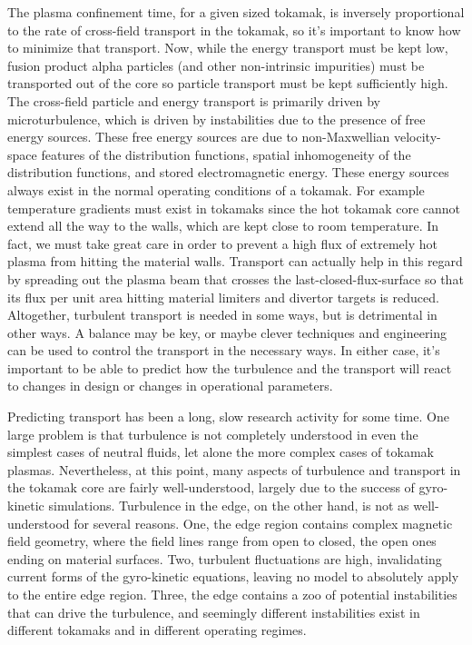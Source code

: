 The plasma confinement time, for a given sized tokamak, is inversely proportional to the rate of cross-field transport in the tokamak, so it's important to know how to minimize that
transport. Now, while the energy transport must be kept low, fusion product alpha particles (and other non-intrinsic impurities) must be transported out of the core so particle transport
must be kept sufficiently high. The cross-field particle and energy transport is primarily driven by microturbulence, which is driven by instabilities due to the presence of free energy sources.
These free energy sources are due to non-Maxwellian velocity-space features of the distribution functions, spatial inhomogeneity of the distribution functions, and stored electromagnetic energy.
These energy sources always exist in the normal operating conditions of a tokamak. For example temperature gradients must exist in tokamaks
since the hot tokamak core cannot extend all the way to the walls, which are kept close to room temperature. In fact, we must take great care in order to prevent a high flux of extremely
hot plasma from hitting the material walls. Transport can actually help in this regard by spreading out the plasma beam that crosses the last-closed-flux-surface so that its flux
per unit area hitting material limiters and divertor targets is reduced. Altogether, turbulent transport is needed in some ways, but is detrimental in other ways. A balance may be key,
or maybe clever techniques and engineering can be used to control the transport in the necessary ways. In either case, it's important to be able to predict how the turbulence and the
transport will react to changes in design or changes in operational parameters. 

Predicting transport has been a long, slow research activity for some time. One large problem is that turbulence is not completely understood in even the simplest cases of neutral fluids,
let alone the more complex cases of tokamak plasmas. Nevertheless, at this point, many aspects of turbulence and transport in the tokamak core are fairly well-understood, largely
due to the success of gyro-kinetic simulations. Turbulence in the edge, on the other hand, is not as well-understood for several reasons. One, the edge region contains complex magnetic
field geometry, where the field lines range from open to closed, the open ones ending on material surfaces. Two, turbulent fluctuations are high, invalidating current forms of the
gyro-kinetic equations, leaving no model to absolutely apply to the entire edge region. Three, the edge contains a zoo of potential instabilities that can drive the turbulence,
and seemingly different instabilities exist in different tokamaks and in different operating regimes.

